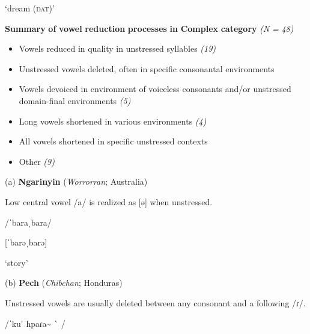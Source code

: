 ‘dream (\textsc{dat})’



\citep[35]{Slater2003}
\z



\ea\label{ex:(6.18)}
  \textbf{Summary} \textbf{of} \textbf{vowel} \textbf{reduction} \textbf{processes} \textbf{in} \textbf{Complex} \textbf{category} \textit{(N} \textit{=} \textit{48)}


\begin{itemize}
\item 
Vowels reduced in quality in unstressed syllables \textit{(19)}

\item 
Unstressed vowels deleted, often in specific consonantal environments \textit{}

\item 
Vowels devoiced in environment of voiceless consonants and/or unstressed domain-final environments \textit{(5)}

\item 
Long vowels shortened in various environments \textit{(4)}

\item 
All vowels shortened in specific unstressed contexts \textit{}

\item 
Other \textit{(9)}

\end{itemize}

(a)   \textbf{Ngarinyin} (\textit{Worrorran}; Australia)



Low central vowel /a/ is realized as [ə] when unstressed.



/ˈbaraˌbara/



[ˈbarəˌbarə]



‘story’



\citep[17-18]{Rumsey1978}



(b)  \textbf{Pech} (\textit{Chibchan}; Honduras)



Unstressed vowels are usually deleted between any consonant and a following /ɾ/.



/ˈku\'{} hpaɾa\~{} \`{} /



